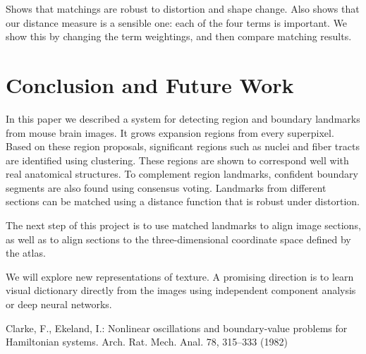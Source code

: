 \documentclass{llncs}
\begin{document}
Shows that matchings are robust to distortion and shape change.
Also shows that our distance measure is a sensible one: each of the four terms is important. We show this by changing the term weightings, and then compare matching results.

\section{Conclusion and Future Work}

In this paper we described a system for detecting region and boundary landmarks from mouse brain images. It grows expansion regions from every superpixel. Based on these region proposals, significant regions such as nuclei and fiber tracts are identified using clustering. These regions are shown to correspond well with real anatomical structures. To complement region landmarks, confident boundary segments are also found using consensus voting. Landmarks from different sections can be matched using a distance function that is robust under distortion.

The next step of this project is to use matched landmarks to align image sections, as well as to align sections to the three-dimensional coordinate space defined by the atlas.

We will explore new representations of texture. A promising direction is to learn visual dictionary directly from the images using independent component analysis or deep neural networks.


%
%
\begin{thebibliography}{5}
%
Clarke, F., Ekeland, I.:
Nonlinear oscillations and
boundary-value problems for Hamiltonian systems.
Arch. Rat. Mech. Anal. 78, 315--333 (1982)

\end{thebibliography}
\end{document}
